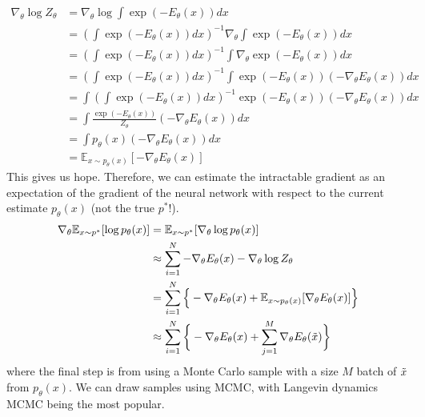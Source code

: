 \documentclass{article}
\begin{document}
  \begin{align}
    \nabla_\theta \log Z_\theta & = \nabla_\theta \log \int \exp(-E_\theta(x))dx \\
                                & = \left(\int \exp(-E_\theta(x))dx\right)^{-1} \nabla_\theta \int \exp(-E_\theta(x))dx \\
                                & = \left(\int \exp(-E_\theta(x))dx\right)^{-1} \int \nabla_\theta \exp(-E_\theta(x))dx \\
                                & = \left(\int \exp(-E_\theta(x))dx\right)^{-1} \int \exp(-E_\theta(x))(-\nabla_\theta E_\theta(x))dx \\
                                & = \int \left(\int \exp(-E_\theta(x))dx\right)^{-1} \exp(-E_\theta(x))(-\nabla_\theta E_\theta(x))dx \\
                                & = \int \frac{\exp(-E_\theta(x))}{Z_\theta}(-\nabla_\theta E_\theta(x))dx \\
                                & = \int p_\theta(x)(-\nabla_\theta E_\theta(x))dx \\
                                & = \mathbb{E}_{x\sim p_\theta(x)}[-\nabla_\theta E_\theta(x)]
  \end{align}
  This gives us hope. Therefore, we can estimate the intractable gradient as an expectation of the gradient of the neural network with respect to the current estimate $p_\theta (x)$ (not the true $p^\ast$!). 
  \begin{align}
    \nabla_\theta \mathbb{E}_{x \sim p^\ast} [ \log p_\theta (x)] & = \mathbb{E}_{x \sim p^\ast} [ \nabla_\theta \log p_\theta (x) ] \\
                                                                  & \approx \sum_{i=1}^N - \nabla_\theta E_\theta (x) - \nabla_\theta \log Z_\theta \\
                                                                  & = \sum_{i=1}^N \Big\{ -\nabla_\theta E_\theta (x) + \mathbb{E}_{x \sim p_\theta (x)} [ \nabla_\theta E_\theta (x)] \Big\} \\
                                                                  & \approx \sum_{i=1}^N \bigg\{ -\nabla_\theta E_\theta (x) +  \sum_{j=1}^M \nabla_\theta E_\theta (\Tilde{x}) \bigg\}
  \end{align}
  where the final step is from using a Monte Carlo sample with a size $M$ batch of $\Tilde{x}$ from $p_\theta (x)$. We can draw samples using MCMC, with Langevin dynamics MCMC being the most popular. 
\end{document}
